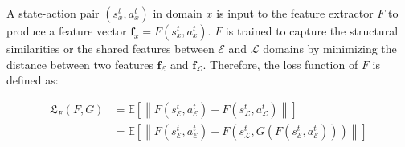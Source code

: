 A state-action pair $(s^t_x, a^t_x)$ in domain $x$ is  input to the feature extractor $F$ to produce a feature vector $\mathbf{f}_x=F(s^t_x, a^t_x)$.
$F$ is trained to capture the structural similarities or the shared features between $\mathcal{E}$ and $\mathcal{L}$ domains by minimizing the distance between two features $\mathbf{f}_\mathcal{E}$ and $\mathbf{f}_\mathcal{L}$.
Therefore, the loss function of $F$ is defined as:

\begin{align}
  \mathfrak{L}_F (F, G) & = \mathbb{E} \left[ \left\|
    F(s^t_\mathcal{E}, a^t_\mathcal{E}) - F(s^t_\mathcal{L}, a^t_\mathcal{L})
  \right\| \right]                                    \\
                        & = \mathbb{E} \left[ \left\|
    F(s^t_\mathcal{E}, a^t_\mathcal{E}) - F( s^t_\mathcal{L}, G( F( s^t_\mathcal{E}, a^t_\mathcal{E} ) ) )
    \right\| \right]
\end{align}
